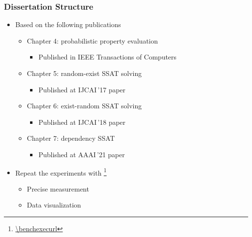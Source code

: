 \begin{frame}
    \frametitle{Dissertation Structure}
    \begin{itemize}
        \item Based on the following publications
              \pause
              \begin{itemize}
                  \item Chapter 4: probabilistic property evaluation
                        \pause
                        \begin{itemize}
                            \item Published in IEEE Transactions of Computers~\cite{LeeTC18ProbDesign}
                                  \pause
                        \end{itemize}
                  \item Chapter 5: random-exist SSAT solving
                        \pause
                        \begin{itemize}
                            \item Published at IJCAI\,'17 paper~\cite{LeeIJCAI17RESSAT}
                                  \pause
                        \end{itemize}
                  \item Chapter 6: exist-random SSAT solving
                        \pause
                        \begin{itemize}
                            \item Published at IJCAI\,'18 paper~\cite{LeeIJCAI18ERSSAT}
                                  \pause
                        \end{itemize}
                  \item Chapter 7: dependency SSAT
                        \pause
                        \begin{itemize}
                            \item Published at AAAI\,'21 paper~\cite{LeeAAAI21DSSAT}
                                  \pause
                        \end{itemize}
              \end{itemize}
        \item Repeat the experiments with \benchexec\footnote{\url{\benchexecurl}}
              \pause
              \begin{itemize}
                  \item Precise measurement
                        \pause
                  \item Data visualization
              \end{itemize}
    \end{itemize}
\end{frame}